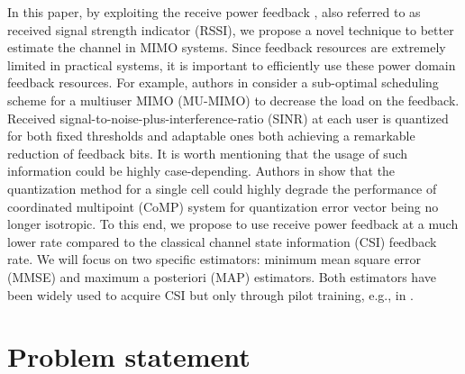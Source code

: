 \documentclass[francais]{gretsi}
\begin{document}
In this paper, by exploiting the receive power feedback \cite{Zhang-TWC-2017}, also referred to as received signal strength indicator (RSSI), we propose a novel technique to better estimate the channel in MIMO systems. {Since feedback resources are extremely limited in practical systems, it is important to efficiently use these power domain feedback resources. For example, authors in \cite{Panda-ICACCI-2016} consider a sub-optimal scheduling scheme for a multiuser MIMO (MU-MIMO) to decrease the load on the feedback. Received signal-to-noise-plus-interference-ratio (SINR) at each user is quantized for both fixed thresholds and adaptable ones both achieving a remarkable reduction of feedback bits. It is worth mentioning that the usage of such information could be highly case-depending.  Authors in \cite{Su-TVT-2015} show that the quantization method for a single cell could highly degrade the performance of coordinated multipoint (CoMP) system for quantization error vector being no longer isotropic.} To this end, we propose to use receive power feedback at a much lower rate compared to the classical channel state information (CSI)  feedback rate. We will focus on two  specific estimators: minimum mean square error (MMSE) and maximum a posteriori (MAP) estimators. Both estimators have been widely used to acquire CSI but only through pilot training, e.g., in \cite{caire-tit-2010}\cite{vincent-book}.


\section{Problem statement}
\end{document}
